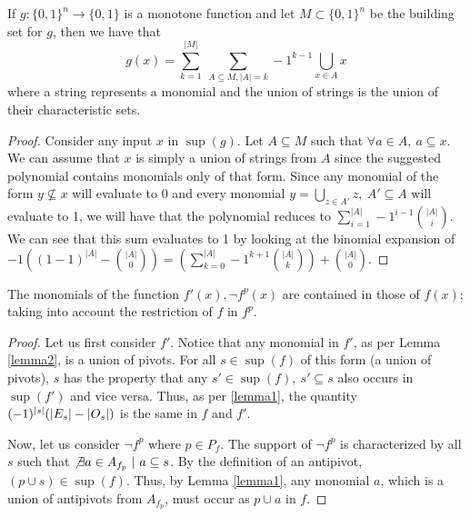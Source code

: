 \begin{lemma}\label{lemma2}
	If $g:\{0, 1\}^n \rightarrow \{0, 1\}$ is a monotone function and let $M \subset \{0,1\}^n$ be the building set for $g$, then we have that $$g(x) = \sum_{k=1}^{|M|} \ \sum_{A \subseteq M, |A| = k} -1^{k-1} \bigcup_{x \in A} x$$ where a string represents a monomial and the union of strings is the union of their characteristic sets.

	\begin{proof}
		Consider any input $x$ in $\sup(g)$. Let $A \subseteq M$ such that $\forall a \in A, \ a \subseteq x$. We can assume that $x$ is simply a union of strings from $A$ since the suggested polynomial contains monomials only of that form. Since any monomial of the form $y \not \subseteq x$ will evaluate to 0 and every monomial $y = \bigcup_{z \in A'}z, \ A' \subseteq A$ will evaluate to 1, we will have that the polynomial reduces to $\sum_{i=1}^{|A|} -1^{i-1} \binom{|A|}{i}$. We can see that this sum evaluates to 1 by looking at the binomial expansion of  \\ $ -1((1 - 1)^{|A|} - \binom{|A|}{0}) = (\sum_{k = 0}^{|A|} -1^{k+1} \binom{|A|}{k}) + \binom{|A|}{0}$.
	\end{proof}

\end{lemma}

\begin{proposition}\label{prop2}
	The monomials of the function $f'(x), \neg f^p(x)$ are contained in those of $f(x)$; taking into account the restriction of $f$ in $f^p$. 
	\begin{proof}
		Let us first consider $f'$. Notice that any monomial in $f'$, as per Lemma \ref{lemma2}, is a union of pivots. For all $s \in \sup(f)$ of this form (a union of pivots), $s$ has the property that any $s' \in \sup(f), \ s' \subseteq s$ also occurs in $\sup(f')$ and vice versa. Thus, as per \ref{lemma1}, the quantity $(-1)^{\vert s\vert}(\vert E_s\vert - \vert O_s\vert)$ is the same in $f$ and $f'$. 

		Now, let us consider $\neg f^p$ where $p \in P_f$. The support of $\neg f^p$ is characterized by all $s$ such that $\not \exists a \in A_{f_p} \ | \ a \subseteq s$. By the definition of an antipivot, $(p \cup s) \in \sup(f)$. Thus, by Lemma \ref{lemma1}, any monomial $a$, which is a union of antipivots from $A_{f_p}$, must occur as $p \cup a$ in $f$. 
	\end{proof}
\end{proposition}


